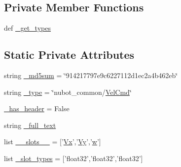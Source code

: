 \subsection*{Private Member Functions}
\begin{DoxyCompactItemize}
\item 
def \hyperlink{classnubot__common_1_1msg_1_1__VelCmd_1_1VelCmd_ac6e0b673f109b90ab688eec4c6a93b58}{\-\_\-get\-\_\-types}
\end{DoxyCompactItemize}
\subsection*{Static Private Attributes}
\begin{DoxyCompactItemize}
\item 
string \hyperlink{classnubot__common_1_1msg_1_1__VelCmd_1_1VelCmd_a81b53ce91a770e47f95801b874aa320b}{\-\_\-md5sum} = \char`\"{}914217797e9c6227112d1ec2a4b462eb\char`\"{}
\item 
string \hyperlink{classnubot__common_1_1msg_1_1__VelCmd_1_1VelCmd_aca5c49d0a9b2c99e1ca02e6909757773}{\-\_\-type} = \char`\"{}nubot\-\_\-common/\hyperlink{classnubot__common_1_1msg_1_1__VelCmd_1_1VelCmd}{Vel\-Cmd}\char`\"{}
\item 
\hyperlink{classnubot__common_1_1msg_1_1__VelCmd_1_1VelCmd_a99a3ace04bc3c1e1c224c7fecc1ef5f6}{\-\_\-has\-\_\-header} = False
\item 
string \hyperlink{classnubot__common_1_1msg_1_1__VelCmd_1_1VelCmd_ae2431998acedfc22fb82f279624d57c4}{\-\_\-full\-\_\-text}
\item 
list \hyperlink{classnubot__common_1_1msg_1_1__VelCmd_1_1VelCmd_a66e5ab2efcbbf8fcc3a919147a57404f}{\-\_\-\-\_\-slots\-\_\-\-\_\-} = \mbox{[}'\hyperlink{classnubot__common_1_1msg_1_1__VelCmd_1_1VelCmd_a66ddd17ab2978517b122751dcaa30b52}{Vx}','\hyperlink{classnubot__common_1_1msg_1_1__VelCmd_1_1VelCmd_a972ff77ffe484e358aabf086e96721f9}{Vy}','\hyperlink{classnubot__common_1_1msg_1_1__VelCmd_1_1VelCmd_a3be3607dc9c4cd8133c6f4cc1d518b67}{w}'\mbox{]}
\item 
list \hyperlink{classnubot__common_1_1msg_1_1__VelCmd_1_1VelCmd_a75c30e2231460baec2166f8e42f26600}{\-\_\-slot\-\_\-types} = \mbox{[}'float32','float32','float32'\mbox{]}
\end{DoxyCompactItemize}


